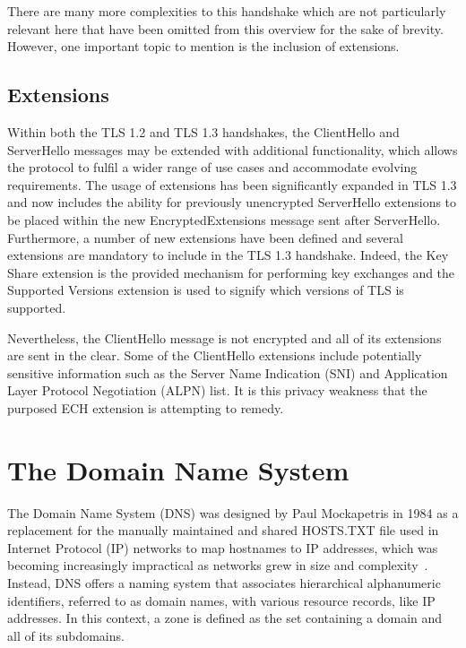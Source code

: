 There are many more complexities to this handshake which are not particularly relevant here that have been omitted from this overview for the sake of brevity. However, one important topic to mention is the inclusion of extensions.

\subsection{Extensions}

Within both the TLS 1.2 and TLS 1.3 handshakes, the ClientHello and ServerHello messages may be extended with additional functionality, which allows the protocol to fulfil a wider range of use cases and accommodate evolving requirements. The usage of extensions has been significantly expanded in TLS 1.3 and now includes the ability for previously unencrypted ServerHello extensions to be placed within the new EncryptedExtensions message sent after ServerHello. Furthermore, a number of new extensions have been defined and several extensions are mandatory to include in the TLS 1.3 handshake. Indeed, the Key Share extension is the provided mechanism for performing key exchanges and the Supported Versions extension is used to signify which versions of TLS is supported.

Nevertheless, the ClientHello message is not encrypted and all of its extensions are sent in the clear. Some of the ClientHello extensions include potentially sensitive information such as the Server Name Indication (SNI) and Application Layer Protocol Negotiation (ALPN) list. It is this privacy weakness that the purposed ECH extension is attempting to remedy.









\section{The Domain Name System}

The Domain Name System (DNS) was designed by Paul Mockapetris in 1984 as a replacement for the manually maintained and shared HOSTS.TXT file used in Internet Protocol (IP) networks to map hostnames to IP addresses, which was becoming increasingly impractical as networks grew in size and complexity~\cite{rfc1034, rfc1035}. Instead, DNS offers a naming system that associates hierarchical alphanumeric identifiers, referred to as domain names, with various resource records, like IP addresses. In this context, a zone is defined as the set containing a domain and all of its subdomains.

